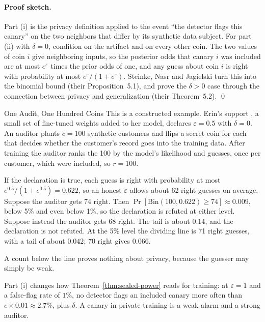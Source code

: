 \paragraph{Proof sketch.}
Part (i) is the privacy definition applied to the event ``the detector flags
this canary'' on the two neighbors that differ by its synthetic data subject. For part (ii) with $\delta=0$, condition on the artifact and on every
other coin. The two values of coin $i$ give neighboring inputs, so the
posterior odds that canary $i$ was included are at most $e^\varepsilon$ times
the prior odds of one, and any guess about coin $i$ is right with probability
at most $e^\varepsilon/(1+e^\varepsilon)$. Steinke, Nasr and Jagielski turn
this into the binomial bound (their Proposition~5.1), and prove the
$\delta>0$ case through the connection between privacy and generalization
(their Theorem~5.2). \qed

\begin{pdexample}{One Audit, One Hundred Coins}
\setlength{\parskip}{4pt plus 1pt}
This is a constructed example. Erin's support , a small set
of fine-tuned weights added to her model, declares $\varepsilon=0.5$ with
$\delta=0$. An auditor plants $c=100$ synthetic customers and flips a secret
coin for each that decides whether the customer's record goes into the
training data. After training the auditor ranks the 100 by the model's
likelihood and guesses, once per customer, which were included, so $r=100$.

If the declaration is true, each guess is right with probability at most
$e^{0.5}/(1+e^{0.5})=0.622$, so an honest $\varepsilon$ allows about 62 right
guesses on average. Suppose the auditor gets 74 right. Then
$\Pr[\mathrm{Bin}(100,0.622)\ge74]\approx0.009$, below 5\% and even below
1\%, so the declaration is refuted at either level. Suppose instead the auditor gets
68 right. The tail is about $0.14$, and the declaration is not refuted. At the
5\% level the dividing line is 71 right guesses, with a tail of about
$0.042$; 70 right gives $0.066$.

A count below the line proves nothing about privacy, because the guesser may
simply be weak.
\end{pdexample}

Part (i) changes how Theorem~\ref{thm:sealed-power} reads for training: at
$\varepsilon=1$ and a false-flag rate of $1\%$, no detector flags an included
canary more often than $e\times0.01\approx2.7\%$, plus $\delta$. A canary in
private training is a weak alarm and a strong auditor.

